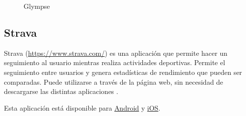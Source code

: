 \begin{figure}[h!btp]
	\begin{adjustbox}{minipage=\linewidth, fbox}
		\centering
		\hspace{10mm}
	\end{adjustbox}
\caption{Glympse}
	\label{fig:glympse}
\end{figure}

\subsection{Strava}
Strava (\url{https://www.strava.com/}) es una aplicación que permite hacer un seguimiento al usuario mientras realiza actividades deportivas. Permite el seguimiento entre usuarios y genera estadísticas de rendimiento que pueden ser comparadas. Puede utilizarse a través de la página web, sin necesidad de descargarse las distintas aplicaciones \cite{Moya12}.

Esta aplicación está disponible para \href{https://play.google.com/store/apps/details?id=com.strava}{Android} y \href{https://itunes.apple.com/app/strava-cycling/id426826309?mt=8}{iOS}.

